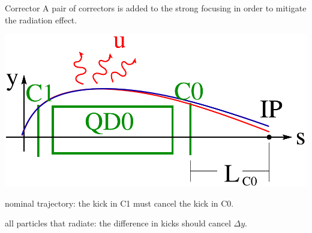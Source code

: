 \documentclass{beamer}
\begin{document}
\begin{frame}{Corrector}
A pair of correctors is added to the strong focusing in order to mitigate the radiation effect.\par
\centering
\includegraphics[scale=0.3,angle=0]{Oide2.pdf}\par\raggedright
{\color{blue}nominal trajectory}: the kick in C1 must cancel the kick in C0.\par
{\color{red}all particles that radiate}: the difference in kicks should cancel $\Delta y$.\par\vspace*{1cm}
\end{frame}
\end{document}
